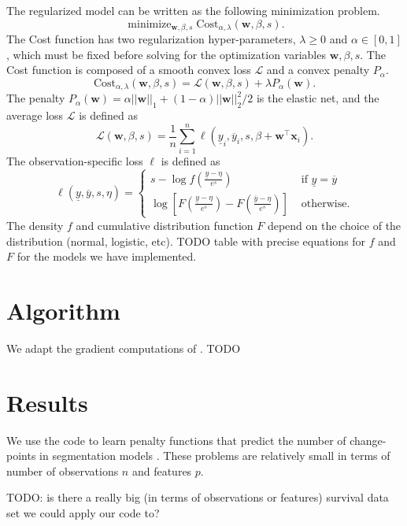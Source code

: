 \documentclass[article]{jss}
\newcommand{\Cost}{\text{Cost}}
\DeclareMathOperator*{\minimize}{minimize}
\begin{document}
The regularized model can be written as the following minimization
problem. 
\begin{equation}
  \label{eq:min_cost}
  \minimize_{
    \mathbf w,
    \beta,
    s
  }
  \Cost_{\alpha,\lambda}(\mathbf w, \beta, s).
\end{equation}
The Cost function has two regularization hyper-parameters,
$\lambda\geq 0$ and $\alpha\in[0,1]$, which must be fixed before
solving for the optimization variables $\mathbf w, \beta, s$. The Cost
function is composed of a smooth convex loss $\mathcal L$ and a convex
penalty $P_\alpha$.
\begin{equation}
  \label{eq:Cost_loss_pen}
  \Cost_{\alpha,\lambda}(\mathbf w, \beta, s) =
  \mathcal L(\mathbf w, \beta, s) +
  \lambda P_\alpha(\mathbf w).
\end{equation}
The penalty
$P_\alpha(\mathbf w)=\alpha||\mathbf w||_1 + (1-\alpha)||\mathbf
w||_2^2/2$ is the elastic net, and the average loss $\mathcal L$ is defined as
\begin{equation}
  \label{eq:Loss}
  \mathcal L(\mathbf w, \beta, s) = 
  \frac 1 n \sum_{i=1}^n \ell(
  \underline y_i, 
  \overline y_i,
  s,
  \beta + \mathbf w^\intercal \mathbf x_i).
\end{equation}
The observation-specific loss $\ell$ is defined as
\begin{equation}
  \label{eq:ell}
\ell(
  \underline y, 
  \overline y,
  s,
  \eta
)=
\begin{cases}
  s-\log f\left(\frac{\underline y - \eta}{e^s}\right) &
  \text{ if } \underline y = \overline y\\
  \log\left[
    F\left(\frac{\underline y-\eta}{e^s}\right)-
    F\left(\frac{\overline y-\eta}{e^s}\right)
  \right] & \text{ otherwise.}
\end{cases}
\end{equation}
The density $f$ and cumulative distribution function $F$ depend on the
choice of the distribution (normal, logistic, etc). TODO table with
precise equations for $f$ and $F$ for the models we have implemented.

\section{Algorithm}

We adapt the gradient computations of \citet{survival-manual}. TODO

\section{Results}

We use the code to learn penalty functions that predict the number of
change-points in segmentation models \citep{HOCKING-penalties,
  PeakSeg}. These problems are relatively small in terms of number of
observations $n$ and features $p$.

TODO: is there a really big (in terms of observations or features)
survival data set we could apply our code to?


\end{document}
